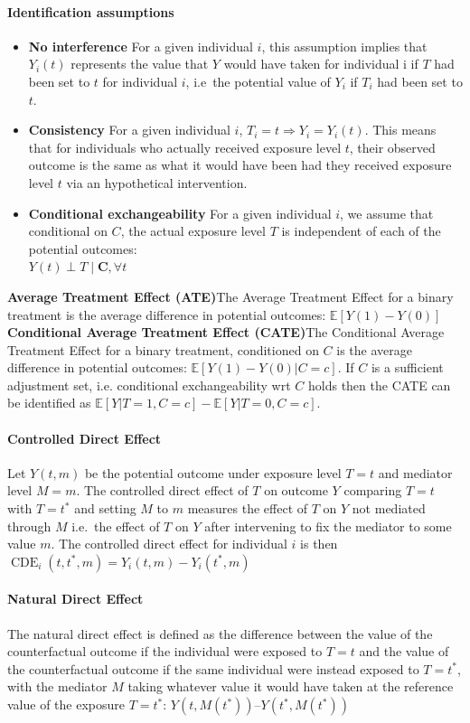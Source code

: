 \paragraph{Identification assumptions}
\begin{itemize}
    \item \textbf{No interference} For a given individual $i$, this assumption implies that $Y_i(t)$ represents the value that $Y$ would have taken for individual i if $T$ had been set to $t$ for individual $i$, i.e\ the potential value of $Y_i$ if $T_i$ had been set to $t$.
    \item \textbf{Consistency} For a given individual $i$, $T_{i}=t \Rightarrow Y_{i}=Y_{i}(t)$. This means that for individuals who actually received exposure level $t$, their observed outcome is the same as what it would have been had they received exposure level $t$ via an hypothetical intervention. 
    \item \textbf{Conditional exchangeability} For a given individual $i$, we assume that conditional on $C$, the actual exposure level $T$ is independent of each of the potential outcomes: \\
    $Y(t) \perp T \mid \mathbf{C}, \forall t$
\end{itemize}
\textbf{Average Treatment Effect (ATE)}{The Average Treatment Effect for a binary treatment is the average difference in potential outcomes: $\mathbb{E}[Y(1)-Y(0)]$}
\textbf{Conditional Average Treatment Effect (CATE)}{The Conditional Average Treatment Effect for a binary treatment, conditioned on $C$ is the average difference in potential outcomes: $\mathbb{E}[Y(1)-Y(0)|C=c]$. If $C$ is a sufficient adjustment set, i.e. conditional exchangeability wrt $C$ holds then the CATE can be identified as $\mathbb{E}[Y|T=1,C=c]-\mathbb{E}[Y|T=0,C=c]$.}
\paragraph{Controlled Direct Effect}{Let $Y(t,m)$ be the potential outcome under exposure level $T = t$ and mediator level $M = m$. The controlled direct effect of $T$ on outcome $Y$ comparing $T=t$ with $T=t^{*}$ and setting $M$ to $m$ measures the effect of $T$ on $Y$ not mediated through $M$ i.e.\ the effect of $T$ on $Y$ after intervening to fix the mediator to some value $m$. The controlled direct effect for individual $i$ is then $\operatorname{CDE}_i(t, t^*, m)=Y_i(t,m)-Y_i(t^{*},m)$ }
\paragraph{Natural Direct Effect}{The natural direct effect is defined as the difference between the value of the counterfactual outcome if the individual were exposed to $T = t$ and the value of the counterfactual outcome if the same individual were instead exposed to $T = t^*$, with the mediator $M$ taking whatever value it would have taken at the reference value of the exposure $T = t^*$: $Y(t,M(t^*)) – Y(t^*,M(t^*))$ }
